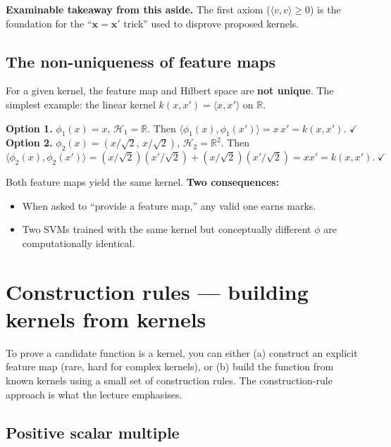 \documentclass[11pt, a4paper]{article}
\begin{document}
\textbf{Examinable takeaway from this aside.} The first axiom ($\langle v, v\rangle \ge 0$) is the foundation for the ``$\mathbf{x} = \mathbf{x}'$ trick'' used to disprove proposed kernels.

\subsection{The non-uniqueness of feature maps}

For a given kernel, the feature map and Hilbert space are \textbf{not unique}. The simplest example: the linear kernel $k(x, x') = \langle x, x'\rangle$ on $\mathbb{R}$.

\begin{exbox}
\textbf{Option 1.} $\phi_1(x) = x$, $\mathcal{H}_1 = \mathbb{R}$. Then $\langle\phi_1(x), \phi_1(x')\rangle = x\,x' = k(x, x')$. $\checkmark$\\[0.3em]
\textbf{Option 2.} $\phi_2(x) = (x/\sqrt 2,\, x/\sqrt 2)$, $\mathcal{H}_2 = \mathbb{R}^2$. Then
\[
\langle\phi_2(x), \phi_2(x')\rangle = (x/\sqrt 2)(x'/\sqrt 2) + (x/\sqrt 2)(x'/\sqrt 2) = x x' = k(x, x'). \;\checkmark
\]
\end{exbox}

Both feature maps yield the same kernel. \textbf{Two consequences:}
\begin{itemize}
  \item When asked to ``provide a feature map,'' any valid one earns marks.
  \item Two SVMs trained with the same kernel but conceptually different $\phi$ are computationally identical.
\end{itemize}

\section{Construction rules --- building kernels from kernels}

To prove a candidate function is a kernel, you can either (a) construct an explicit feature map (rare, hard for complex kernels), or (b) build the function from known kernels using a small set of construction rules. The construction-rule approach is what the lecture emphasises.

\subsection{Positive scalar multiple}
\end{document}

